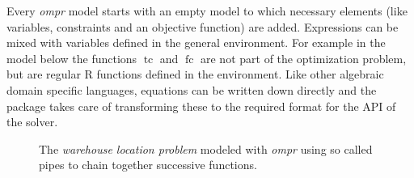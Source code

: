 \documentclass{optima}\usepackage[]{graphicx}\usepackage[]{color}
\makeatletter
\newcommand{\hlnum}[1]{\textcolor[rgb]{0.686,0.059,0.569}{#1}}%
\newcommand{\hlstr}[1]{\textcolor[rgb]{0.192,0.494,0.8}{#1}}%
\newcommand{\hlopt}[1]{\textcolor[rgb]{0,0,0}{#1}}%
\newcommand{\hlstd}[1]{\textcolor[rgb]{0.345,0.345,0.345}{#1}}%
\newcommand{\hlkwb}[1]{\textcolor[rgb]{0.69,0.353,0.396}{#1}}%
\newcommand{\hlkwc}[1]{\textcolor[rgb]{0.333,0.667,0.333}{#1}}%
\newcommand{\hlkwd}[1]{\textcolor[rgb]{0.737,0.353,0.396}{\textbf{#1}}}%
\newenvironment{kframe}{%
 \def\at@end@of@kframe{}%
 \ifinner\ifhmode%
  \def\at@end@of@kframe{\end{minipage}}%
  \begin{minipage}{\columnwidth}%
 \fi\fi%
 \def\FrameCommand##1{\hskip\@totalleftmargin \hskip-\fboxsep
 \colorbox{shadecolor}{##1}\hskip-\fboxsep
     \hskip-\linewidth \hskip-\@totalleftmargin \hskip\columnwidth}%
 \MakeFramed {\advance\hsize-\width
   \@totalleftmargin\z@ \linewidth\hsize
   \@setminipage}}%
 {\par\unskip\endMakeFramed%
 \at@end@of@kframe}
\newenvironment{knitrout}{}{} %
\makeatother
\begin{document}
Every \emph{ompr} model starts with an empty model to which necessary elements (like variables, constraints and an objective function) are added. Expressions can be mixed with  variables defined in the general environment. For example in the model below the functions $\operatorname{tc}$ and $\operatorname{fc}$ are not part of the optimization problem, but are regular R functions defined in the environment. Like other algebraic domain specific languages, equations can be written down directly and the package takes care of transforming these to the required format for the API of the solver.

\begin{figure}[h]
\caption{The \emph{warehouse location problem} modeled with \emph{ompr} using so called pipes to chain together successive functions. }
\end{figure}
\end{document}
